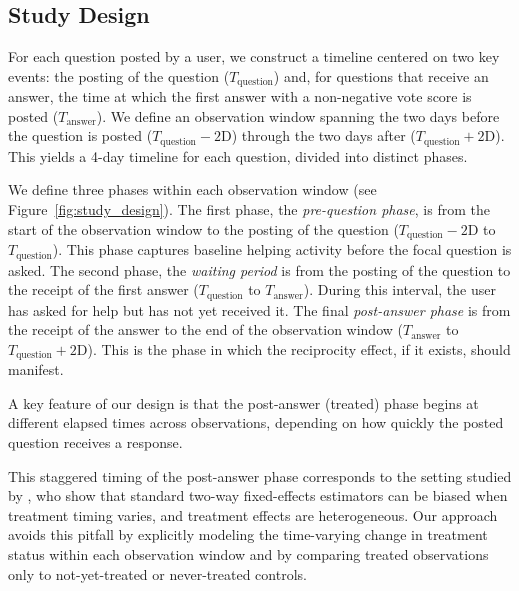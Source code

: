 \subsection{Study Design}
\label{sec:study_design}

For each question posted by a user, we construct a timeline centered on two key events: the posting of the question ($T_{\text{question}}$) and, for questions that receive an answer, the time at which the first answer with a non-negative vote score is posted ($T_{\text{answer}}$). We define an observation window spanning the two days before the question is posted ($T_{\text{question}} - 2\text{D}$) through the two days after ($T_{\text{question}} + 2\text{D}$). This yields a 4-day timeline for each question, divided into distinct phases.

We define three phases within each observation window (see Figure~\ref{fig:study_design}). The first phase, the \textit{pre-question phase}, is from the start of the observation window to the posting of the question ($T_{\text{question}} - 2\text{D}$ to $T_{\text{question}}$). This phase captures baseline helping activity before the focal question is asked.
The second phase, the \textit{waiting period} is from the posting of the question to the receipt of the first answer ($T_{\text{question}}$ to $T_{\text{answer}}$). During this interval, the user has asked for help but has not yet received it. 
The final \textit{post-answer phase} is from the receipt of the answer to the end of the observation window ($T_{\text{answer}}$ to $T_{\text{question}} + 2\text{D}$). This is the phase in which the reciprocity effect, if it exists, should manifest.

A key feature of our design is that the post-answer (treated) phase begins at different elapsed times across observations, depending on how quickly the posted question receives a response.

This staggered timing of the post-answer phase corresponds to the setting studied by \citet{callaway_santanna_2021}, who show that standard two-way fixed-effects estimators can be biased when treatment timing varies, and treatment effects are heterogeneous. Our approach avoids this pitfall by explicitly modeling the time-varying change in treatment status within each observation window and by comparing treated observations only to not-yet-treated or never-treated controls.

